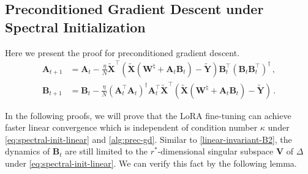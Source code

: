 \subsection{Preconditioned Gradient Descent under Spectral Initialization}
\label{app:precgdlr}
Here we present the proof for preconditioned gradient descent.
\begin{equation}\tag{Prec-GD}\label{alg:prec-gd}
\begin{aligned}
    \bm A_{t+1} & = \bm A_t - \frac{\eta}{N}\widetilde{\bm X}^{\!\top}\left(\widetilde{\bm X}\left(\bm W^\natural+\bm A_t \bm B_t\right)-\widetilde{\bm Y}\right)\bm B_t^{\!\top}\left(\bm B_t \bm B_t^{\!\top}\right)^\dagger\,,\\
    \bm B_{t+1} & = \bm B_t - \frac{\eta}{N}\left(\bm A_t^{\!\top} \bm A_t\right)^\dagger\bm A_t^{\!\top}\widetilde{\bm X}^{\!\top}\left(\widetilde{\bm X}\left(\bm W^\natural+\bm A_t \bm B_t\right)-\widetilde{\bm Y}\right)\,.
\end{aligned}
\end{equation}

In the following proofs, we will prove that the LoRA fine-tuning can achieve faster linear convergence which is independent of condition number $\kappa$ under \eqref{eq:spectral-init-linear} and \eqref{alg:prec-gd}. Similar to \cref{linear-invariant-B2}, the dynamics of $\bm B_t$ are still limited to the $r^*$-dimensional singular subspace $\bm V$ of $\Delta$ under \eqref{eq:spectral-init-linear}. We can verify this fact by the following lemma.

